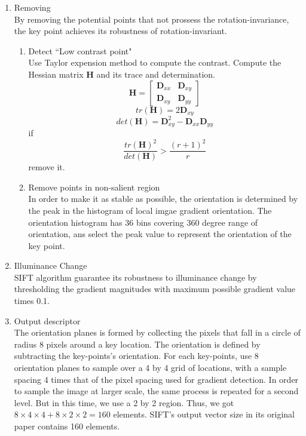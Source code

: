 \documentclass[11pt]{article}
\newcommand{\mtx}[1]{\bm{#1}}
\begin{document}
\begin{enumerate}
\item Removing \\
By removing the potential points that not prossess the rotation-invariance, the key point achieves its robustness of rotation-invariant.
\begin{enumerate}
\item Detect ``Low contrast point" \\
Use Taylor expension method to compute the contrast.
Compute the Hessian matrix $\mtx H$ and its trace and determination.
\begin{equation}
\mtx H=\begin{bmatrix} \mtx D_{ xx } &\mtx D_{ xy } \\\mtx D_{ xy } &\mtx D_{ yy } \end{bmatrix}
\end{equation}
\begin{equation}
tr(\mtx H)=2 \mtx D_{ xy }
\end{equation}
\begin{equation}
det(\mtx H)=\mtx D_{ xy }^2-\mtx D_{ xx }\mtx D_{ yy }
\end{equation}
if 
\begin{equation}
\frac { tr(\mtx H)^2 }{ det(\mtx H) } > \frac { (r+1)^2 }{ r }
\end{equation}
remove it.

\item Remove points in non-salient region\\
In order to make it as stable as possible, the orientation is determined by the peak in the histogram of local imgae gradient orientation. The orientation histogram has 36 bins covering 360 degree range of orientation, ans select the peak value to represent the orientation of the key point.
\end{enumerate} 

\item Illuminance Change\\
SIFT algorithm guarantee its robustness to illuminance change by thresholding the gradient magnitudes with maximum possible gradient value times 0.1. 


\item Output descriptor\\
The orientation planes is formed by collecting the pixels that fall in a circle of radius 8 pixels around a key location. The orientation is defined by subtracting the key-points's orientation.
For each key-points, use 8 orientation planes to sample over a 4 by 4 grid of locations, with a sample spacing 4 times that of the pixel spacing used for gradient detection. In order to sample the image at larger scale, the same process is repeated for a second level. But in this time, we use a 2 by 2 region. Thus, we got $8 \times 4 \times 4 + 8 \times 2 \times 2 = 160$ elements.
SIFT’s output vector size in its original paper contains 160 elements.
\end{enumerate} 
\end{document}
